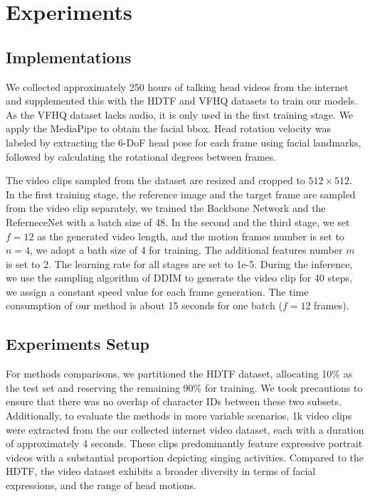 \section{Experiments}

\subsection{Implementations}
We collected approximately 250 hours of talking head videos from the internet and supplemented this with the HDTF\cite{hdtf} and VFHQ\cite{vfhq} datasets to train our models. As the VFHQ dataset lacks audio, it is only used in the first training stage. We apply the MediaPipe\cite{mediapipe} to obtain the facial bbox. Head rotation velocity was labeled by extracting the 6-DoF head pose for each frame using facial landmarks, followed by calculating the rotational degrees between frames.

The video clips sampled from the dataset are resized and cropped to $512\times{512}$. In the first training stage, the reference image and the target frame are sampled from the video clip separately, we trained the Backbone Network and the ReferneceNet with a batch size of 48. In the second and the third stage, we set $f=12$ as the generated video length, and the motion frames number is set to $n=4$, we adopt a bath size of 4 for training. The additional features number $m$ is set to 2. The learning rate for all stages are set to 1e-5. During the inference, we use the sampling algorithm of DDIM to generate the video clip for 40 steps, we assign a constant speed value for each frame generation. The time consumption of our method is about 15 seconds for one batch ($f=12$ frames).

\subsection{Experiments Setup}

For methods comparisons, we partitioned the HDTF dataset, allocating 10\% as the test set and reserving the remaining 90\% for training. We took precautions to ensure that there was no overlap of character IDs between these two subsets. Additionally, to evaluate the methods in more variable scenarios, 1k video clips were extracted from the our collected internet video dataset, each with a duration of approximately 4 seconds. These clips predominantly feature expressive portrait videos with a substantial proportion depicting singing activities. Compared to the HDTF, the video dataset exhibits a broader diversity in terms of facial expressions, and the range of head motions.

